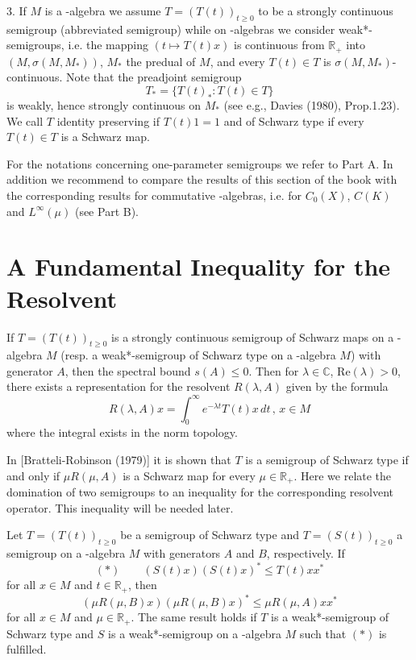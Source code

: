 3. If $ M $ is a \CA-algebra we assume $ T = (T(t))_{t \geq 0} $ to be a strongly continuous semigroup (abbreviated semigroup) while on \WA-algebras we consider weak*-semigroups, i.e. the mapping $ (t \mapsto T(t)x) $ is continuous from $ \mathbb{R}_+ $ into $ (M,\sigma(M,M_{*})) $, $ M_{*} $ the predual of $ M $, and every $ T(t) \in T $ is $ \sigma(M,M_{*}) $-continuous.
Note that the preadjoint semigroup
\[
T_{*} = \{ T(t)_{*} : T(t) \in T \}
\]
is weakly, hence strongly continuous on $ M_{*} $ (see e.g., Davies (1980), Prop.1.23).
We call $ T $ identity preserving if $ T(t)1 = 1 $ and of Schwarz type if every $ T(t) \in T $ is a Schwarz map.

For the notations concerning one-parameter semigroups we refer to Part A.
In addition we recommend to compare the results of this section of the book with the corresponding results for commutative \CA-algebras, i.e. for $ C_0(X) $, $ C(K) $ and $ L^\infty(\mu) $ (see Part B).

\section{A Fundamental Inequality for the Resolvent}\label{sec:fundamental}

If $ T = (T(t))_{t\geq0} $ is a strongly continuous semigroup of Schwarz maps on a \CA-algebra $ M $ (resp. a weak*-semigroup of Schwarz type on a \WA-algebra $ M $) with generator $ A $, then the spectral bound $ s(A) \leq 0 $.
Then for $ \lambda \in \mathbb{C} $, $ \text{Re}(\lambda) > 0 $, there exists a representation for the resolvent $ R(\lambda,A) $ given by the formula
\[
R(\lambda,A)x = \int_0^\infty e^{-\lambda t} T(t)x \, dt \, , \, x \in M
\]
where the integral exists in the norm topology.



In [Bratteli-Robinson (1979)] it is shown that $ T $ is a semigroup of Schwarz type if and only if $ \mu R(\mu,A) $ is a Schwarz map for every $ \mu \in \mathbb{R}_+ $.
Here we relate the domination of two semigroups to an inequality for the corresponding resolvent operator.
This inequality will be needed later.

\begin{theorem}\label{thm:2.1}
Let $ T = (T(t))_{t\geq0} $ be a semigroup of Schwarz type and $ T = (S(t))_{t\geq0} $ a semigroup on a \CA-algebra $ M $ with generators $ A $ and $ B $, respectively.
If
\[
(*) \qquad (S(t)x)(S(t)x)^* \leq T(t)xx^*
\]
for all $ x \in M $ and $ t \in \mathbb{R}_+ $, then
\[
(\mu R(\mu,B)x)(\mu R(\mu,B)x)^* \leq \mu R(\mu,A)xx^*
\]
for all $ x \in M $ and $ \mu \in \mathbb{R}_+ $.
The same result holds if $ T $ is a weak*-semigroup of Schwarz type and $ S $ is a weak*-semigroup on a \WA-algebra $ M $ such that $ (*) $ is fulfilled.
\end{theorem}

